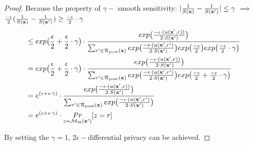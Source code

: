 \documentclass{article}
\begin{document}
\begin{proof}
  Because the property of $\gamma -$ smooth sensitivity: $|\frac{1}{S(\textbf{x})} - \frac{1}{S(\textbf{x}')}| \leq \gamma$ $\implies$
  $\frac{- \epsilon}{2}
  (\frac{1}{S(\textbf{x})}-
  \frac{1}{S(\textbf{x}')}) \geq \frac{- \epsilon}{2} \cdot \gamma$
      \begin{equation*}
  \begin{split}
  & \leq exp\big( \frac{\epsilon}{2} + \frac{\epsilon}{2} \cdot \gamma\big) \cdot 
  \frac {
  exp
  \big(
  \frac{-\epsilon\cdot(u(\textbf{x}', {r}))}{2\cdot S(\textbf{x}')}
  \big)
  } 
  {
  \sum_{r'\in \mathcal{R}_{\textup{post}}(\textbf{x})} 
  exp 
  \big(
  \frac{-\epsilon\cdot(u(\textbf{x}', {r'})}{2 \cdot S(\textbf{x}')}
  \big)
  exp 
  \big(
  \frac{-\epsilon}{2}
  \big)
  exp
  \big(
  \frac{- \epsilon}{2} \cdot \gamma
  \big)
  }\\
  & = exp\big( \frac{\epsilon}{2} + \frac{\epsilon}{2} \cdot \gamma\big) \cdot 
  \frac {
  exp
  \big(
  \frac{-\epsilon\cdot(u(\textbf{x}', {r}))}{2\cdot S(\textbf{x}')}
  \big)
  } 
  {
  \sum_{r'\in \mathcal{R}_{\textup{post}}(\textbf{x})} 
  exp 
  \big(
  \frac{-\epsilon\cdot(u(\textbf{x}', {r'})}{2 \cdot S(\textbf{x}')}
  \big)
  exp 
  \big(
  \frac{-\epsilon}{2} +   \frac{- \epsilon}{2} \cdot \gamma
  \big)
  }\\
  & = e^{(\epsilon + \epsilon \cdot \gamma )} \cdot 
  \frac {
  exp
  \big(
  \frac{-\epsilon\cdot(u(\textbf{x}', {r}))}{2\cdot S(\textbf{x}')}
  \big)
  } 
  {
  \sum_{r'\in \mathcal{R}_{\textup{post}}(\textbf{x})} 
  exp 
  \big(
  \frac{-\epsilon\cdot(u(\textbf{x}', {r'})}{2 \cdot S(\textbf{x}')}
  \big)
  }\\
  & = e^{( \epsilon + \epsilon \cdot \gamma )} \cdot   \underset{z \thicksim \mathcal{M}_{\mathcal{H}}(\textbf{x}')}{Pr}[z = r]
  \end{split}
  \end{equation*}

  By setting the $\gamma = 1$, $2\epsilon - $differential privacy can be achieved.
\end{proof}



\end{document}
